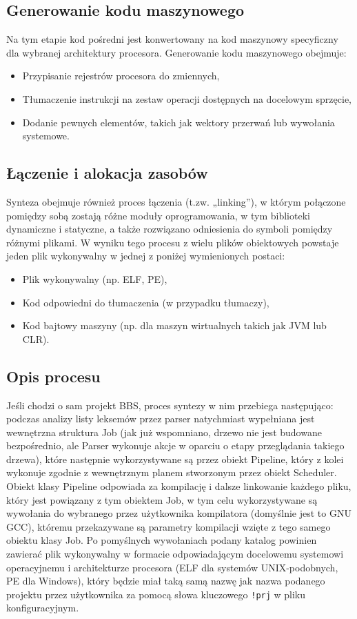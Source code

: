 \subsection{Generowanie kodu maszynowego}
Na tym etapie kod pośredni jest konwertowany na kod maszynowy specyficzny dla wybranej architektury procesora. Generowanie kodu maszynowego obejmuje:

\begin{itemize}
    \item Przypisanie rejestrów procesora do zmiennych,
    \item Tłumaczenie instrukcji na zestaw operacji dostępnych na docelowym sprzęcie,
    \item Dodanie pewnych elementów, takich jak wektory przerwań lub wywołania systemowe.
\end{itemize}

\subsection{Łączenie i alokacja zasobów}
Synteza obejmuje również proces łączenia (t.zw. „linking”), w którym połączone pomiędzy sobą zostają różne moduły oprogramowania, w tym biblioteki dynamiczne i statyczne, a także rozwiązano odniesienia do symboli pomiędzy różnymi plikami. W wyniku tego procesu z wielu plików obiektowych powstaje jeden plik wykonywalny w jednej z poniżej wymienionych postaci:

\begin{itemize}
    \item Plik wykonywalny (np. ELF, PE),
    \item Kod odpowiedni do tłumaczenia (w przypadku tłumaczy),
    \item Kod bajtowy maszyny (np. dla maszyn wirtualnych takich jak JVM lub CLR).
\end{itemize}

\subsection{Opis procesu}

Jeśli chodzi o sam projekt BBS, proces syntezy w nim przebiega następująco: podczas analizy listy leksemów przez parser natychmiast wypełniana jest wewnętrzna struktura Job (jak już wspomniano, drzewo nie jest budowane bezpośrednio, ale Parser wykonuje akcje w oparciu o etapy przeglądania takiego drzewa), które następnie wykorzystywane są przez obiekt Pipeline, który z kolei wykonuje zgodnie z wewnętrznym planem stworzonym przez obiekt Scheduler. Obiekt klasy Pipeline odpowiada za kompilację i dalsze linkowanie każdego pliku, który jest powiązany z tym obiektem Job, w tym celu wykorzystywane są wywołania do wybranego przez użytkownika kompilatora (domyślnie jest to GNU GCC), któremu przekazywane są parametry kompilacji wzięte z tego samego obiektu klasy Job. Po pomyślnych wywołaniach podany katalog powinien zawierać plik wykonywalny w formacie odpowiadającym docelowemu systemowi operacyjnemu i architekturze procesora (ELF dla systemów UNIX-podobnych, PE dla Windows), który będzie miał taką samą nazwę jak nazwa podanego projektu przez użytkownika za pomocą słowa kluczowego \texttt{!prj} w pliku konfiguracyjnym.


